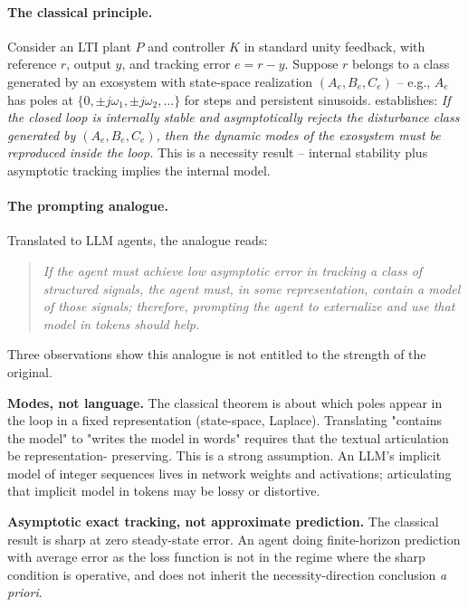 \documentclass[11pt]{article}
\begin{document}
\paragraph{The classical principle.}  Consider an LTI plant $P$ and
controller $K$ in standard unity feedback, with reference $r$,
output $y$, and tracking error $e = r - y$.  Suppose $r$ belongs to
a class generated by an exosystem with state-space realization
$(A_e, B_e, C_e)$ -- e.g., $A_e$ has poles at $\{0, \pm j\omega_1,
\pm j\omega_2, \dots\}$ for steps and persistent sinusoids.
\citet[Theorem~1]{francis1976internal} establishes:
\emph{If the closed loop is internally stable and asymptotically
rejects the disturbance class generated by $(A_e, B_e, C_e)$, then
the dynamic modes of the exosystem must be reproduced inside the
loop.}  This is a necessity result -- internal stability plus
asymptotic tracking implies the internal model.

\paragraph{The prompting analogue.}  Translated to LLM agents, the
analogue reads:
\begin{quote}
\emph{If the agent must achieve low asymptotic error in tracking a
class of structured signals, the agent must, in some
representation, contain a model of those signals; therefore,
prompting the agent to externalize and use that model in tokens
should help.}
\end{quote}

Three observations show this analogue is not entitled to the
strength of the original.

\textbf{Modes, not language.}  The classical theorem is about which
poles appear in the loop in a fixed representation (state-space,
Laplace).  Translating "contains the model" to "writes the model
in words" requires that the textual articulation be representation-
preserving.  This is a strong assumption.  An LLM's implicit model
of integer sequences lives in network weights and activations;
articulating that implicit model in tokens may be lossy or
distortive.

\textbf{Asymptotic exact tracking, not approximate prediction.}  The
classical result is sharp at zero steady-state error.  An agent
doing finite-horizon prediction with average error as the loss
function is not in the regime where the sharp condition is
operative, and does not inherit the necessity-direction conclusion
\emph{a priori}.
\end{document}
